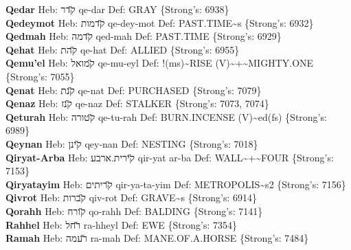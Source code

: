 {\textbf{Qedar} Heb: {\large\H קדר} qe-dar Def: GRAY \{Strong's: 6938\}\hfill{}\\

\textbf{Qedeymot} Heb: {\large\H קדמות} qe-dey-mot Def: PAST.TIME\textasciitilde{}s \{Strong's: 6932\}\hfill{}\\

\textbf{Qedmah} Heb: {\large\H קדמה} qed-mah Def: PAST.TIME \{Strong's: 6929\}\hfill{}\\

\textbf{Qehat} Heb: {\large\H קהת} qe-hat Def: ALLIED \{Strong's: 6955\}\hfill{}\\

\textbf{Qemu'el} Heb: {\large\H קמואל} qe-mu-eyl Def: !(ms)\textasciitilde{}RISE (V)\textasciitilde{}+\textasciitilde{}MIGHTY.ONE \{Strong's: 7055\}\hfill{}\\

\textbf{Qenat} Heb: {\large\H קנת} qe-nat Def: PURCHASED \{Strong's: 7079\}\hfill{}\\

\textbf{Qenaz} Heb: {\large\H קנז} qe-naz Def: STALKER \{Strong's: 7073, 7074\}\hfill{}\\

\textbf{Qeturah} Heb: {\large\H קטורה} qe-tu-rah Def: BURN.INCENSE (V)\textasciitilde{}ed(fs) \{Strong's: 6989\}\hfill{}\\

\textbf{Qeynan} Heb: {\large\H קינן} qey-nan Def: NESTING \{Strong's: 7018\}\hfill{}\\

\textbf{Qiryat-Arba} Heb: {\large\H קירית.ארבע} qir-yat ar-ba Def: WALL\textasciitilde{}+\textasciitilde{}FOUR \{Strong's: 7153\}\hfill{}\\

\textbf{Qiryatayim} Heb: {\large\H קריתים} qir-ya-ta-yim Def: METROPOLIS\textasciitilde{}s2 \{Strong's: 7156\}\hfill{}\\

\textbf{Qivrot} Heb: {\large\H קברות} qiv-rot Def: GRAVE\textasciitilde{}s \{Strong's: 6914\}\hfill{}\\

\textbf{Qorahh} Heb: {\large\H קורח} qo-rahh Def: BALDING \{Strong's: 7141\}\hfill{}\\

\textbf{Rahhel} Heb: {\large\H רחל} ra-hheyl Def: EWE \{Strong's: 7354\}\hfill{}\\

\textbf{Ramah} Heb: {\large\H רעמה} ra-mah Def: MANE.OF.A.HORSE \{Strong's: 7484\}\hfill{}\\

}
